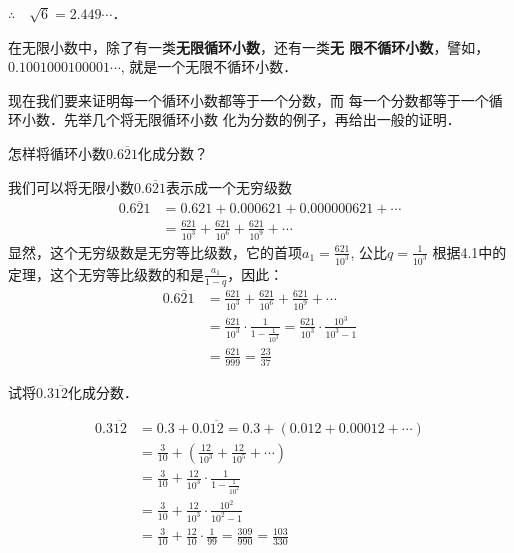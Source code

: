 $\therefore\quad \sqrt{6}=2.449\cdots$．

在无限小数中，除了有一类\textbf{无限循环小数}，还有一类\textbf{无
限不循环小数}，譬如，$0.1001000100001\cdots$,
就是一个无限不循环小数．

现在我们要来证明每一个循环小数都等于一个分数，而
每一个分数都等于一个循环小数．先举几个将无限循环小数
化为分数的例子，再给出一般的证明．


\begin{example}
    怎样将循环小数$0.\overline{621}$化成分数？
\end{example}

\begin{solution}
    我们可以将无限小数$0.\overline{621}$表示成一个无穷级数
\[\begin{split}
0.\overline{621}&=0.621+0.000621+0.000000621+\cdots\\
&=\frac{621}{10^3}+\frac{621}{10^6}+\frac{621}{10^9}+\cdots
\end{split}\]
显然，这个无穷级数是无穷等比级数，它的首项$a_1=\frac{621}{10^3}$, 公比$q=\frac{1}{10^3}$
根据4.1中的定理，这个无穷等比级数的和是$\frac{a_1}{1-q}$，因此：
\[\begin{split}
    0.\overline{621}&=\frac{621}{10^3}+\frac{621}{10^6}+\frac{621}{10^9}+\cdots\\
    &=\frac{621}{10^3}\cdot \frac{1}{1-\frac{1}{10^3}}=\frac{621}{10^3}\cdot \frac{10^3}{10^3-1}\\
    &=\frac{621}{999}=\frac{23}{37}
\end{split}\]
\end{solution}

\begin{example}
试将$0.3\overline{12}$化成分数．
\end{example}

\begin{solution}
\[\begin{split}
    0.3\overline{12}&= 0.3+0.0\overline{12}=0.3+(0.012+0.00012+\cdots)\\
    &=\frac{3}{10}+\left(\frac{12}{10^3}+\frac{12}{10^5}+\cdots\right)\\
    &=\frac{3}{10}+\frac{12}{10^3}\cdot \frac{1}{1-\frac{1}{10^2}}\\
    &=\frac{3}{10}+\frac{12}{10^3}\cdot \frac{10^2}{10^2-1}\\
    &=\frac{3}{10}+\frac{12}{10}\cdot \frac{1}{99}=\frac{309}{990}=\frac{103}{330}
\end{split}\]
\end{solution}

